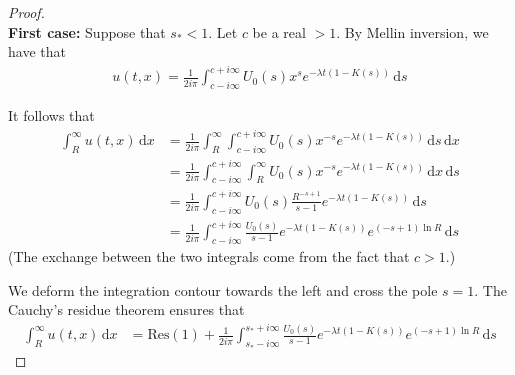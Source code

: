 \documentclass[11pt]{amsart}
\newcommand{\diff}{\,\mathrm{d}}
\begin{document}
\begin{proof}\text{}\\

\textbf{First case:} Suppose that $s_* < 1$. Let $c$ be a real $>1$. 
By Mellin inversion, we have that
\begin{align*}
    u(t,x) = \frac{1}{2i\pi}\int_{c-i\infty}^{c+i\infty} U_0(s) x^{s} e^{-\lambda t(1 - K(s))} \diff s
\end{align*}

It follows that
\begin{align*}
    \int_R^\infty u(t,x) \diff x 
    &= \frac{1}{2i\pi} \int_R^\infty \int_{c-i\infty}^{c+i\infty} U_0(s) x^{-s} e^{-\lambda t(1 - K(s))} \diff s \diff x \\
    &= \frac{1}{2i\pi} \int_{c-i\infty}^{c+i\infty} \int_R^\infty U_0(s) x^{-s} e^{-\lambda t(1 - K(s))} \diff x \diff s \\
    &= \frac{1}{2i\pi} \int_{c-i\infty}^{c+i\infty} U_0(s) \frac{R^{-s+1}}{s-1} e^{-\lambda t(1 - K(s))} \diff s \\
    &= \frac{1}{2i\pi} \int_{c-i\infty}^{c+i\infty}\frac{U_0(s)}{s-1} e^{-\lambda t(1 - K(s))} e^{(-s+1)\ln R} \diff s 
\end{align*}
(The exchange between the two integrals come from the fact that $c > 1$.)

We deform the integration contour towards the left and cross the pole $s = 1$. The Cauchy's residue theorem ensures that
\begin{align}
    \int_R^\infty u(t,x) \diff x &= \mathrm{Res(1)} + \frac{1}{2i\pi} \int_{s_*-i\infty}^{s_*+i\infty} \frac{U_0(s)}{s-1} e^{-\lambda t(1 - K(s))} e^{(-s+1)\ln R} \diff s
    \label{eq:cauchy1}
\end{align}


\end{proof}
\end{document}
